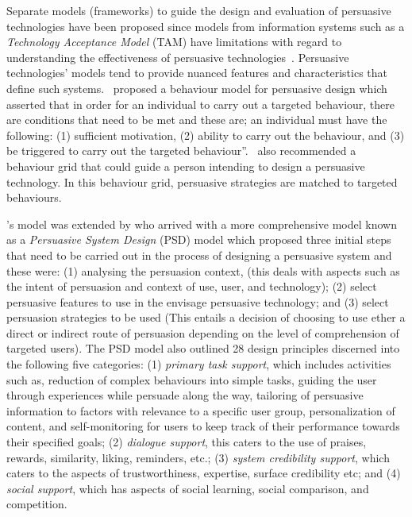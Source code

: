 Separate models (frameworks) to guide the design and evaluation of persuasive technologies have been proposed since models from information systems such as a \emph{Technology Acceptance Model} (TAM) have limitations with regard to understanding the effectiveness of persuasive technologies~\citep{Oinas-kukkonen:psd}. Persuasive technologies' models tend to provide nuanced features and characteristics that define such systems.~\cite{fogg2009behavior} proposed a behaviour model for persuasive design which asserted that in order for an individual to carry out a targeted behaviour, there are conditions that need to be met and these are; an individual must have  the following: (1) sufficient motivation, (2) ability to carry out the behaviour, and (3) be triggered to carry out the targeted behaviour''.~\cite{fogg2009behavior2} also recommended a behaviour grid that could guide a person intending to design a persuasive technology. In this behaviour grid, persuasive strategies are matched to targeted behaviours. 

\cite{fogg2009behavior}'s model was extended by \cite{Oinas-kukkonen:psd} who arrived with a more comprehensive model known as a \emph{Persuasive System Design} (PSD) model which proposed three initial steps that need to be carried out in the process of designing a persuasive system and these were: (1) analysing the persuasion context, (this deals with aspects such as the intent of persuasion and context of use, user, and technology); (2) select persuasive features to use in the envisage persuasive technology; and (3) select persuasion strategies to be used (This entails a decision of choosing to use ether a direct or indirect route of persuasion depending on the level of comprehension of targeted users). The PSD model also outlined 28 design principles discerned into the following five categories: (1) \emph{primary task support}, which includes activities such as, reduction of complex behaviours into simple tasks, guiding the user through experiences while persuade along the way, tailoring of persuasive information to factors with relevance to a specific user group, personalization of content, and self-monitoring for users to keep track of their performance towards their specified goals; (2) \emph{dialogue support}, this caters to the use of praises, rewards, similarity, liking, reminders, etc.; (3) \emph{system credibility support}, which caters to the aspects of trustworthiness, expertise, surface credibility etc; and (4) \emph{social support}, which has aspects of social learning, social comparison, and competition.

